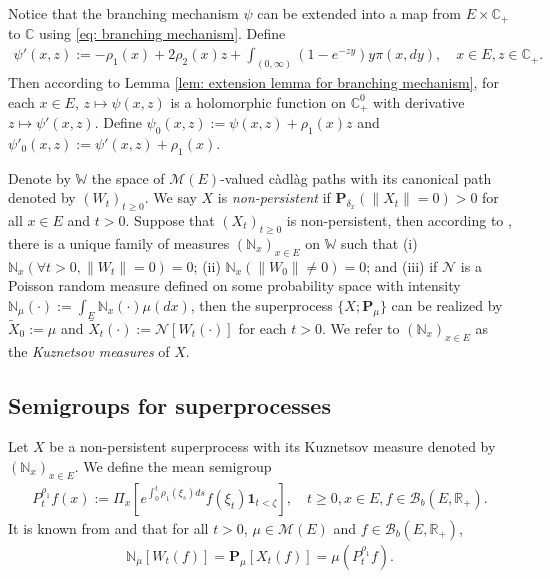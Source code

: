 \documentclass[EJP]{ejpecp} %
\begin{document}
Notice that the branching mechanism $\psi$ can be extended into a map from $E \times \mathbb C_+$ to $\mathbb C$ using \eqref{eq: branching mechanism}.
Define
\begin{align}
  \psi'(x,z)
  := - \rho_1(x) + 2\rho_2(x) z + \int_{(0,\infty)} (1-e^{-zy})y\pi(x,dy),
  \quad x\in E, z\in \mathbb C_+.
\end{align}
Then according to Lemma \ref{lem: extension lemma for branching mechanism}, for each $x \in E$, $z \mapsto \psi(x,z)$ is a holomorphic function on $\mathbb C_+^0$ with derivative $z \mapsto \psi'(x,z)$.
Define $\psi_0(x,z) := \psi(x,z)+ \rho_1(x)z $ and $\psi'_0(x,z) := \psi'(x,z) + \rho_1(x)$.

Denote by $\mathbb W$ the space of $\mathcal M(E)$-valued c\`{a}dl\`{a}g paths with its canonical path denoted by $(W_t)_{t\geq 0}$.
We say $X$ is \emph{non-persistent} if $\mathbf P_{\delta_x}(\|X_t\|= 0) > 0$ for all $x\in E$ and $t> 0$.
Suppose that $(X_t)_{t\geq 0}$ is non-persistent, then according to \cite[Section 8.4]{Li2011Measure-valued}, there is a unique family of measures $(\mathbb N_x)_{x\in E}$ on $\mathbb W$ such that
(i) $\mathbb N_x (\forall t > 0, \|W_t\|=0) =0$;
(ii) $\mathbb N_x(\|W_0 \|\neq 0) = 0$;
and (iii) if $\mathcal N$ is a Poisson random measure defined on some probability space with intensity $\mathbb N_\mu(\cdot):= \int_E \mathbb N_x(\cdot )\mu(dx)$, then the superprocess $\{X;\mathbf P_\mu\}$ can be realized by $\widetilde X_0 := \mu$ and $\widetilde X_t(\cdot) := \mathcal N[W_t(\cdot)]$ for each $t>0$.
We refer to $(\mathbb N_x)_{x\in E}$ as the \emph{Kuznetsov measures} of $X$.

\subsection{Semigroups for superprocesses}
\label{sec: definition of vf}
Let $X$ be a non-persistent superprocess with its Kuznetsov measure denoted by $(\mathbb N_x)_{x\in E}$.
We define the mean semigroup
\begin{align}
  P_t^{\rho_1} f(x)
  := \Pi_{x}[e^{\int_0^t \rho_1(\xi_s)ds}f(\xi_t) \mathbf 1_{t< \zeta}],
  \quad t\geq 0, x\in E, f\in \mathcal B_b(E,\mathbb R_+).
\end{align}
It is known from \cite[Proposition 2.27]{Li2011Measure-valued} and \cite[Theorem 2.7]{Kyprianou2014Fluctuations} that for all $t > 0$, $\mu \in \mathcal M(E)$ and $f\in \mathcal B_b(E,\mathbb R_+)$,
\begin{align}
  \label{eq: mean formula for superprocesses}
  \mathbb N_{\mu}[W_t(f)]
  =\mathbf P_{\mu}[X_t(f)]
  =\mu(P^{\rho_1}_t f).
\end{align}
\end{document}
